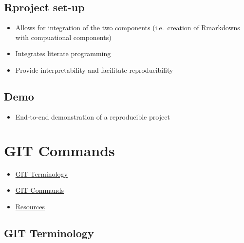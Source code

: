 \documentclass[
]{book}
\providecommand{\tightlist}{%
  \setlength{\itemsep}{0pt}\setlength{\parskip}{0pt}}
\begin{document}
\hypertarget{rproject-set-up}{%
\section{Rproject set-up}\label{rproject-set-up}}

\begin{itemize}
\tightlist
\item
  Allows for integration of the two components (i.e.~creation of Rmarkdowns with compuational components)
\item
  Integrates literate programming
\item
  Provide interpretability and facilitate reproducibility
\end{itemize}

\hypertarget{demo}{%
\section{Demo}\label{demo}}

\begin{itemize}
\tightlist
\item
  End-to-end demonstration of a reproducible project
\end{itemize}

\hypertarget{git-commands}{%
\chapter{GIT Commands}\label{git-commands}}

\begin{itemize}
\tightlist
\item
  \protect\hyperlink{git-terminology}{GIT Terminology}
\item
  \protect\hyperlink{git-commands}{GIT Commands}
\item
  \protect\hyperlink{resources}{Resources}
\end{itemize}

\hypertarget{git-terminology}{%
\section{GIT Terminology}\label{git-terminology}}
\end{document}
